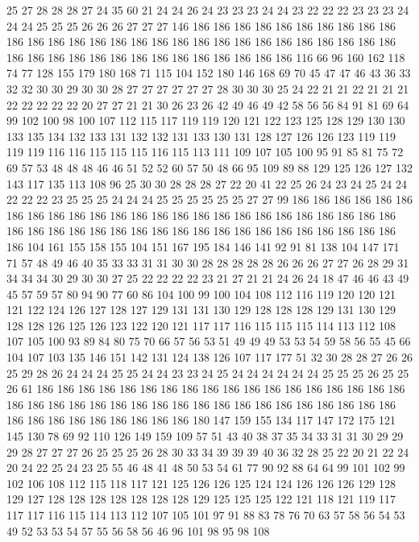 25 27 28 28 28 27 24 35 60 21 24 24 26 24 23 23 23 24 24 23
22 22 22 23 23 23 24 24 24 25 25 25 26 26 26 27 27 27 146 186
186 186 186 186 186 186 186 186 186 186 186 186 186 186 186 186 186 186 186 186
186 186 186 186 186 186 186 186 186 186 186 186 186 186 186 186 186 186 186 186
186 186 116 66 96 160 162 118 74 77 128 155 179 180 168 71 115 104 152 180
146 168 69 70 45 47 47 46 43 36 33 32 32 30 30 29 30 30 28 27
27 27 27 27 27 28 30 30 30 25 24 22 21 21 22 21 21 21 22 22
22 22 22 20 27 27 21 21 30 26 23 26 42 49 46 49 42 58 56 56
84 91 81 69 64 99 102 100 98 100 107 112 115 117 119 119 120 121 122 123
125 128 129 130 130 133 135 134 132 133 131 132 132 131 133 130 131 128 127 126
126 123 119 119 119 119 116 116 115 115 115 116 115 113 111 109 107 105 100 95
91 85 81 75 72 69 57 53 48 48 48 46 46 51 52 52 60 57 50 48
66 95 109 89 88 129 125 126 127 132 143 117 135 113 108 96 25 30 30 28
28 28 27 22 20 41 22 25 26 24 23 24 25 24 24 22 22 22 23 25
25 25 24 24 24 25 25 25 25 25 25 27 27 99 186 186 186 186 186 186
186 186 186 186 186 186 186 186 186 186 186 186 186 186 186 186 186 186 186 186
186 186 186 186 186 186 186 186 186 186 186 186 186 186 186 186 186 186 186 104
161 155 158 155 104 151 167 195 184 146 141 92 91 81 138 104 147 171 71 57
48 49 46 40 35 33 33 31 31 30 30 28 28 28 28 28 26 26 26 27
27 26 28 29 31 34 34 34 30 29 30 30 27 25 22 22 22 22 23 21
27 21 21 24 26 24 18 47 46 46 43 49 45 57 59 57 80 94 90 77
60 86 104 100 99 100 104 108 112 116 119 120 120 121 121 122 124 126 127 128
127 129 131 131 130 129 128 128 128 129 131 130 129 128 128 126 125 126 123 122
120 121 117 117 116 115 115 115 114 113 112 108 107 105 100 93 89 84 80 75
70 66 57 56 53 51 49 49 49 53 53 54 59 58 56 55 45 66 104 107
103 135 146 151 142 131 124 138 126 107 117 177 51 32 30 28 28 27 26 26
25 29 28 26 24 24 24 25 25 24 24 23 23 24 25 24 24 24 24 24
24 25 25 25 26 25 25 26 61 186 186 186 186 186 186 186 186 186 186 186
186 186 186 186 186 186 186 186 186 186 186 186 186 186 186 186 186 186 186 186
186 186 186 186 186 186 186 186 186 186 186 186 186 186 186 180 147 159 155 134
117 147 172 175 121 145 130 78 69 92 110 126 149 159 109 57 51 43 40 38
37 35 34 33 31 31 30 29 29 29 28 27 27 27 26 25 25 25 26 28
30 33 34 39 39 39 40 36 32 28 25 22 20 21 22 24 20 24 22 25
24 23 25 55 46 48 41 48 50 53 54 61 77 90 92 88 64 64 99 101
102 99 102 106 108 112 115 118 117 121 125 126 126 125 124 124 126 126 126 129
128 129 127 128 128 128 128 128 128 128 129 125 125 125 122 121 118 121 119 117
117 117 116 115 114 113 112 107 105 101 97 91 88 83 78 76 70 63 57 58
56 54 53 49 52 53 53 54 57 55 56 58 56 46 96 101 98 95 98 108

